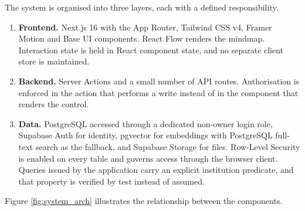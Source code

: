 The system is organised into three layers, each with a defined responsibility.

\begin{enumerate}
    \item \textbf{Frontend.} Next.js 16 with the App Router, Tailwind CSS v4, Framer Motion and Base UI components. React Flow renders the mindmap. Interaction state is held in React component state, and no separate client store is maintained.
    \item \textbf{Backend.} Server Actions and a small number of API routes. Authorisation is enforced in the action that performs a write instead of in the component that renders the control.
    \item \textbf{Data.} PostgreSQL accessed through a dedicated non-owner login role, Supabase Auth for identity, pgvector for embeddings with PostgreSQL full-text search as the fallback, and Supabase Storage for files. Row-Level Security is enabled on every table and governs access through the browser client. Queries issued by the application carry an explicit institution predicate, and that property is verified by test instead of assumed.
\end{enumerate}

Figure \ref{fig:system_arch} illustrates the relationship between the components.

